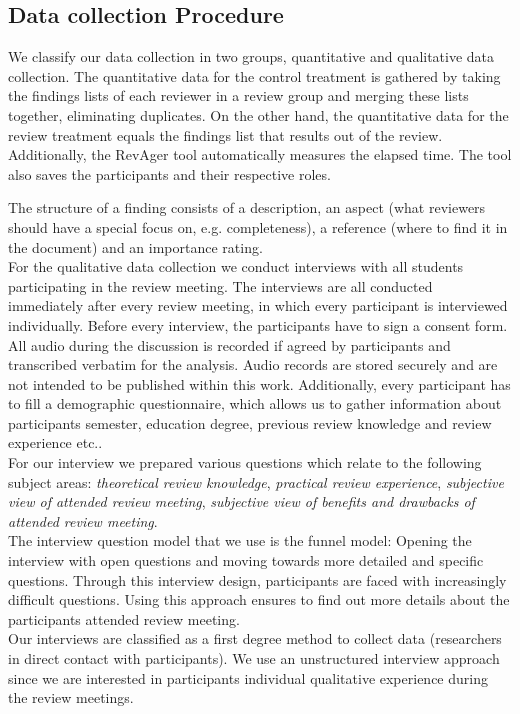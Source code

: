 \subsection{Data collection Procedure}

We classify our data collection in two groups, quantitative and qualitative data collection.
The quantitative data for the control treatment is gathered by taking the findings lists of each reviewer in a review group and merging these lists together, eliminating duplicates.
On the other hand, the quantitative data for the review treatment equals the findings list that results out of the review. Additionally, the RevAger tool automatically measures the elapsed time.
The tool also saves the participants and their respective roles.

The structure of a finding consists of a description, an aspect (what reviewers should have a special focus on, e.g. completeness), a reference (where to find it in the document) and an importance rating. \\

For the qualitative data collection we conduct interviews with all students participating in the review meeting. The interviews are all conducted immediately after every review meeting, in which every participant is interviewed individually.  Before every interview, the participants have to sign a consent form. All audio during the discussion is recorded if agreed by participants and transcribed verbatim for the analysis. Audio records are stored securely and are not intended to be published within this work. Additionally, every participant has to fill a demographic questionnaire, which allows us to gather information about participants semester, education degree, previous review knowledge and review experience etc.. \\
For our interview we prepared various questions which relate to the following subject areas: \textit{theoretical review knowledge}, \textit{practical review experience}, \textit{subjective view of attended review meeting}, \textit{subjective view of benefits and drawbacks of attended review meeting}.\\
The interview question model that we use is the funnel model: Opening the interview with open questions and moving towards more detailed and specific questions. Through this interview design, participants are faced with increasingly difficult questions.  Using this approach ensures to find out more details about the participants attended review meeting. \\
Our interviews are classified as a first degree method to collect data (researchers in direct contact with participants). We use an unstructured interview approach since we are interested in participants individual qualitative experience during the review meetings.\\


